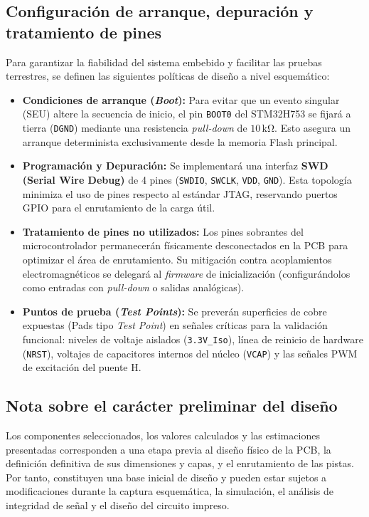 \documentclass[11pt,a4paper]{article}
\begin{document}
\subsection{Configuración de arranque, depuración y tratamiento de pines}

Para garantizar la fiabilidad del sistema embebido y facilitar las pruebas terrestres, se definen las siguientes políticas de diseño a nivel esquemático:

\begin{itemize}
    \item \textbf{Condiciones de arranque (\textit{Boot}):} Para evitar que un evento singular (SEU) altere la secuencia de inicio, el pin \texttt{BOOT0} del STM32H753 se fijará a tierra (\texttt{DGND}) mediante una resistencia \textit{pull-down} de $10\,\mathrm{k\Omega}$. Esto asegura un arranque determinista exclusivamente desde la memoria Flash principal.
    \item \textbf{Programación y Depuración:} Se implementará una interfaz \textbf{SWD (Serial Wire Debug)} de 4 pines (\texttt{SWDIO}, \texttt{SWCLK}, \texttt{VDD}, \texttt{GND}). Esta topología minimiza el uso de pines respecto al estándar JTAG, reservando puertos GPIO para el enrutamiento de la carga útil.
    \item \textbf{Tratamiento de pines no utilizados:} Los pines sobrantes del microcontrolador permanecerán físicamente desconectados en la PCB para optimizar el área de enrutamiento. Su mitigación contra acoplamientos electromagnéticos se delegará al \textit{firmware} de inicialización (configurándolos como entradas con \textit{pull-down} o salidas analógicas).
    \item \textbf{Puntos de prueba (\textit{Test Points}):} Se preverán superficies de cobre expuestas (Pads tipo \textit{Test Point}) en señales críticas para la validación funcional: niveles de voltaje aislados (\texttt{3.3V\_Iso}), línea de reinicio de hardware (\texttt{NRST}), voltajes de capacitores internos del núcleo (\texttt{VCAP}) y las señales PWM de excitación del puente H.
\end{itemize}

\subsection*{Nota sobre el carácter preliminar del diseño}

Los componentes seleccionados, los valores calculados y las
estimaciones presentadas corresponden a una etapa previa al diseño
físico de la PCB, la definición definitiva de sus dimensiones y
capas, y el enrutamiento de las pistas. Por tanto, constituyen una
base inicial de diseño y pueden estar sujetos a modificaciones
durante la captura esquemática, la simulación, el análisis de
integridad de señal y el diseño del circuito impreso.
\end{document}
